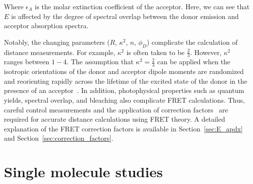 \noindent
Where $\epsilon_A$ is the molar extinction coefficient of the acceptor.
Here, we can see that $E$ is affected by the degree of spectral overlap between the donor emission and acceptor absorption spectra. 

Notably, the changing parameters ($R$, $\kappa^2$, $n$, $\phi_D$) complicate the calculation of distance measurements.
For example, $\kappa^2$ is often taken to be $\frac{2}{3}$.
However, $\kappa^2$ ranges between $1 - 4$.
The assumption that $\kappa^2 = \frac{2}{3}$ can be applied when the isotropic orientations of the donor and acceptor dipole moments are randomized and reorienting rapidly across the lifetime of the excited state of the donor in the presence of an acceptor~\cite{van_der_meer_2013}. 
In addition, photophysical properties such as quantum yields, spectral overlap, and bleaching also complicate FRET calculations. 
Thus, careful control measurements and the application of correction factors~\cite{lee_BPJ_2005, ingargiola_BioRxiv_2017} are required for accurate distance calculations using FRET theory.
A detailed explanation of the FRET correction factors is available in Section~\ref{sec:E_apdx} and Section~\ref{sec:correction_factors}.

\section{Single molecule studies
\label{sec:sm_intro}}

